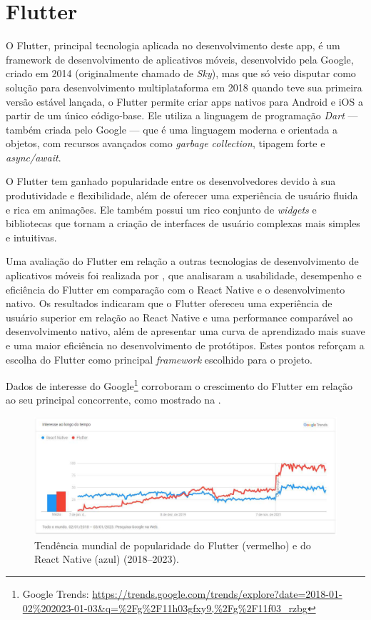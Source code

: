 \section{Flutter}\label{sec:flutter}
O Flutter, principal tecnologia aplicada no desenvolvimento deste \ac{app}, é um framework de desenvolvimento de aplicativos móveis, desenvolvido pela Google, criado em 2014 (originalmente chamado de \textit{Sky}), mas que só veio disputar como solução para desenvolvimento multiplataforma em 2018 quando teve sua primeira versão estável lançada, o Flutter permite criar \acp{app} nativos para Android e iOS a partir de um único código-base. Ele utiliza a linguagem de programação \textit{Dart} — também criada pelo Google — que é uma linguagem moderna e orientada a objetos, com recursos avançados como \textit{garbage collection}, tipagem forte e \textit{async/await}.

O Flutter tem ganhado popularidade entre os desenvolvedores devido à sua produtividade e flexibilidade, além de oferecer uma experiência de usuário fluida e rica em animações. Ele também possui um rico conjunto de \textit{widgets} e bibliotecas que tornam a criação de interfaces de usuário complexas mais simples e intuitivas.

Uma avaliação do Flutter em relação a outras tecnologias de desenvolvimento de aplicativos móveis foi realizada por \cite{Zhou2021}, que analisaram a usabilidade, desempenho e eficiência do Flutter em comparação com o React Native e o desenvolvimento nativo. Os resultados indicaram que o Flutter ofereceu uma experiência de usuário superior em relação ao React Native e uma performance comparável ao desenvolvimento nativo, além de apresentar uma curva de aprendizado mais suave e uma maior eficiência no desenvolvimento de protótipos. Estes pontos reforçam a escolha do Flutter como principal \textit{framework} escolhido para o projeto.

Dados de interesse do Google\footnote{\label{google_trends_flutter_react}Google Trends: \url{https://trends.google.com/trends/explore?date=2018-01-02\%202023-01-03&q=\%2Fg\%2F11h03gfxy9,\%2Fg\%2F11f03_rzbg}} corroboram o crescimento do Flutter em relação ao seu principal concorrente, como mostrado na .

\begin{figure}[h]
\centering
  \includegraphics[width=\columnwidth]{images/interesse_flutter_react.pdf}
  \caption{Tendência mundial de popularidade do Flutter (vermelho) e do React Native (azul) (2018–2023).}
  \label{fig:interesse_flutter_react}
\end{figure}

